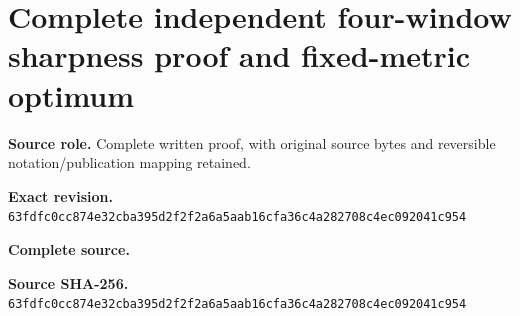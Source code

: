 \begingroup
\sloppy
\small
\section{Complete independent four-window sharpness proof and fixed-metric optimum}
\noindent\textbf{Source role.} Complete written proof, with original source bytes and reversible notation/publication mapping retained.\par
\noindent\textbf{Exact revision.} \nolinkurl{63fdfc0cc874e32cba395d2f2f2a6a5aab16cfa36c4a282708c4ec092041c954}\par
\noindent\textbf{Complete source.} \par
\noindent\textbf{Source SHA-256.} \nolinkurl{63fdfc0cc874e32cba395d2f2f2a6a5aab16cfa36c4a282708c4ec092041c954}\par\medskip

\endgroup
